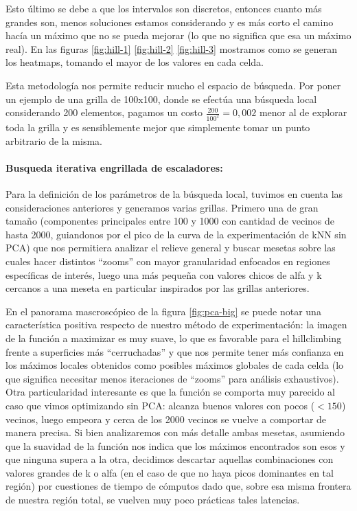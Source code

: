 Esto último se debe a que los intervalos son discretos, entonces
cuanto más grandes son, menos soluciones estamos considerando y es más
corto el camino hacía un máximo que no se pueda mejorar (lo que no
significa que esa un máximo real).  En las figuras \ref{fig:hill-1}
\ref{fig:hill-2} \ref{fig:hill-3} mostramos como se generan los
heatmaps, tomando el mayor de los valores en cada celda.

Esta metodología nos permite reducir mucho el espacio de búsqueda. Por
poner un ejemplo de una grilla de 100x100, donde se efectúa una
búsqueda local considerando 200 elementos, pagamos un costo
$\frac{200}{100^2} = 0,002$ menor al de explorar toda la grilla y es
sensiblemente mejor que simplemente tomar un punto arbitrario de la
misma.

\paragraph{Busqueda iterativa engrillada de escaladores:}

Para la definición de los parámetros de la búsqueda local, tuvimos en
cuenta las consideraciones anteriores y generamos varias
grillas. Primero una de gran tamaño (componentes principales entre 100
y 1000 con cantidad de vecinos de hasta 2000, guiandonos por el pico
de la curva de la experimentación de kNN sin PCA) que nos permitiera
analizar el relieve general y buscar mesetas sobre las cuales hacer
distintos ``zooms'' con mayor granularidad enfocados en regiones
específicas de interés, luego una más pequeña con valores chicos de
alfa y k cercanos a una meseta en particular inspirados por las
grillas anteriores.

En el panorama mascroscópico de la figura \ref{fig:pca-big} se puede
notar una característica positiva respecto de nuestro método de
experimentación: la imagen de la función a maximizar es muy suave, lo
que es favorable para el hillclimbing frente a superficies más
``cerruchadas'' y que nos permite tener más confianza en los máximos
locales obtenidos como posibles máximos globales de cada celda (lo que
significa necesitar menos iteraciones de ``zooms'' para análisis
exhaustivos). Otra particularidad interesante es que la función se
comporta muy parecido al caso que vimos optimizando sin PCA: alcanza
buenos valores con pocos ($<150$) vecinos, luego empeora y cerca de
los 2000 vecinos se vuelve a comportar de manera precisa. Si bien
analizaremos con más detalle ambas mesetas, asumiendo que la suavidad
de la función nos indica que los máximos encontrados son esos y que
ninguna supera a la otra, decidimos descartar aquellas combinaciones
con valores grandes de k o alfa (en el caso de que no haya picos
dominantes en tal región) por cuestiones de tiempo de cómputos dado
que, sobre esa misma frontera de nuestra región total, se vuelven muy
poco prácticas tales latencias.

